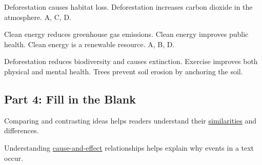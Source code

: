 \documentclass[12pt]{article}
\begin{document}
Deforestation causes habitat loss.
Deforestation increases carbon dioxide in the atmosphere.
A, C, D.

Clean energy reduces greenhouse gas emissions.
Clean energy improves public health.
Clean energy is a renewable resource.
A, B, D.

Deforestation reduces biodiversity and causes extinction.
Exercise improves both physical and mental health.
Trees prevent soil erosion by anchoring the soil.
\subsection*{Part 4: Fill in the Blank}

Comparing and contrasting ideas helps readers understand their \underline{similarities} and differences.

Understanding \underline{cause-and-effect} relationships helps explain why events in a text occur.
\end{document}
